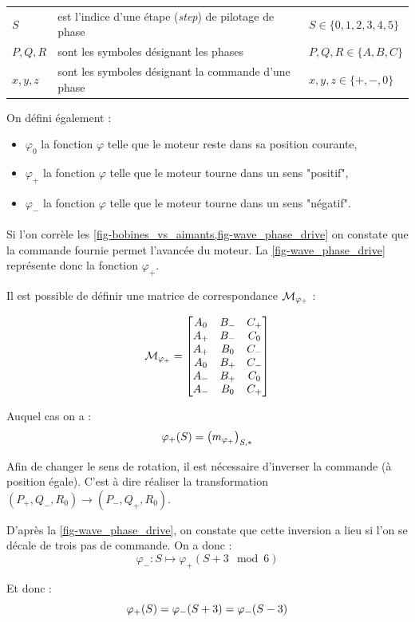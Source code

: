 \begin{tabular}{lll}
    $S$ & est l'indice d'une étape (\emph{step}) de pilotage de phase & $S \in \{0,1,2,3,4,5\}$ \\
    $P, Q, R$ & sont les symboles désignant les phases  & $P,Q,R \in \{A,B,C\}$ \\
    $x, y, z$ & sont les symboles désignant la commande d'une phase & $x, y, z \in \{+,-,0\}$
\end{tabular}
\newline
\newline
On défini également : 
\begin{itemize}
    \item $\varphi_0$ la fonction $\varphi$ telle que le moteur reste dans sa position courante,
    \item $\varphi_+$ la fonction $\varphi$ telle que le moteur tourne dans un sens "positif",
    \item $\varphi_-$ la fonction $\varphi$ telle que le moteur tourne dans un sens "négatif".
\end{itemize}

\paragraph{}

Si l'on corrèle les \cref{fig-bobines_vs_aimants,fig-wave_phase_drive} on constate que la commande fournie permet l'avancée du moteur.
La \cref{fig-wave_phase_drive} représente donc la fonction $\varphi_+$.

Il est possible de définir une matrice de correspondance $\mathcal{M}_{\varphi_{+}}$ :

\[
    \mathcal{M}_{\varphi_{+}} = 
    \begin{bmatrix}
        A_0 & B_- & C_+ \\
        A_+ & B_- & C_0 \\
        A_+ & B_0 & C_- \\
        A_0 & B_+ & C_- \\
        A_- & B_+ & C_0 \\
        A_- & B_0 & C_+ \\
    \end{bmatrix}
\]

Auquel cas on a :
$$\varphi_{+}(S) = \left(m_{\varphi_{+}}\right)_{S,*}$$

Afin de changer le sens de rotation, il est nécessaire d'inverser la commande (à position égale). C'est à dire réaliser la transformation  $(P_+,Q_-,R_0) \to (P_-,Q_+,R_0)$.

D'après la \cref{fig-wave_phase_drive}, on constate que cette inversion a lieu si l'on se décale de trois pas de commande. On a donc :
$$\varphi_- : S \longmapsto \varphi_+(S +3 \mod 6)$$

Et donc :
$$\varphi_{+}(S) = \varphi_{-}(S+3) = \varphi_{-}(S-3)$$
